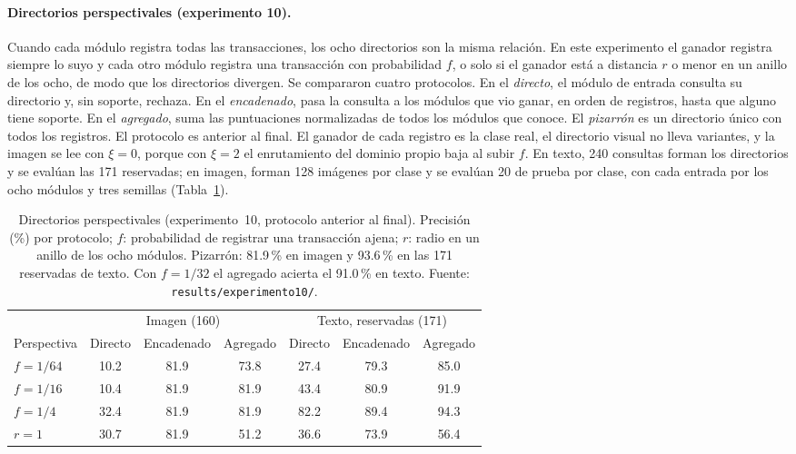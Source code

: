 \paragraph{Directorios perspectivales (experimento 10).}
Cuando cada módulo registra todas las transacciones, los ocho directorios son la misma
relación.
En este experimento el ganador registra siempre lo suyo y cada otro módulo registra una
transacción con probabilidad $f$, o solo si el ganador está a distancia $r$ o menor en un
anillo de los ocho, de modo que los directorios divergen.
Se compararon cuatro protocolos.
En el \emph{directo}, el módulo de entrada consulta su directorio y, sin soporte,
rechaza.
En el \emph{encadenado}, pasa la consulta a los módulos que vio ganar, en orden de
registros, hasta que alguno tiene soporte.
En el \emph{agregado}, suma las puntuaciones normalizadas de todos los módulos que
conoce.
El \emph{pizarrón} es un directorio único con todos los registros.
El protocolo es anterior al final.
El ganador de cada registro es la clase real, el directorio visual no lleva variantes, y la imagen
se lee con $\xi = 0$, porque con $\xi = 2$ el enrutamiento del dominio propio baja al
subir $f$.
En texto, 240 consultas forman los directorios y se evalúan las 171 reservadas; en
imagen, forman 128 imágenes por clase y se evalúan 20 de prueba por clase, con cada
entrada por los ocho módulos y tres semillas (Tabla~\ref{tab:fase4-perspectiva}).

\begin{table}[H]
    \centering
    \caption[Directorios perspectivales y protocolos de enrutamiento]{Directorios
    perspectivales (experimento~10, protocolo anterior al final). Precisión (\%) por
    protocolo; $f$: probabilidad de registrar una transacción ajena; $r$: radio en un
    anillo de los ocho módulos. Pizarrón: 81.9\,\% en imagen y 93.6\,\% en las 171
    reservadas de texto. Con $f = 1/32$ el agregado acierta el 91.0\,\% en texto. Fuente:
    \texttt{results/experimento10/}.}
    \label{tab:fase4-perspectiva}
    \small
    \begin{tabular}{lcccccc}
        \toprule
        & \multicolumn{3}{c}{Imagen (160)} & \multicolumn{3}{c}{Texto, reservadas (171)} \\
        \cmidrule(lr){2-4} \cmidrule(lr){5-7}
        Perspectiva & Directo & Encadenado & Agregado & Directo & Encadenado & Agregado \\
        \midrule
        $f = 1/64$ & 10.2 & 81.9 & 73.8 & 27.4 & 79.3 & 85.0 \\
        $f = 1/16$ & 10.4 & 81.9 & 81.9 & 43.4 & 80.9 & 91.9 \\
        $f = 1/4$  & 32.4 & 81.9 & 81.9 & 82.2 & 89.4 & 94.3 \\
        $r = 1$    & 30.7 & 81.9 & 51.2 & 36.6 & 73.9 & 56.4 \\
        \bottomrule
    \end{tabular}
\end{table}

